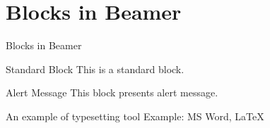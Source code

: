 \documentclass{beamer}
\begin{document}
	\section{Blocks in Beamer}
	\begin{frame}{Blocks in Beamer}
		\begin{block}{Standard Block}
			This is a standard block.
		\end{block}
		\begin{alertblock}{Alert Message}
			This block presents alert message.
		\end{alertblock}
		\begin{exampleblock}{An example of typesetting tool}
			Example: MS Word, \LaTeX{}
		\end{exampleblock}
	\end{frame} 
	
\end{document}
